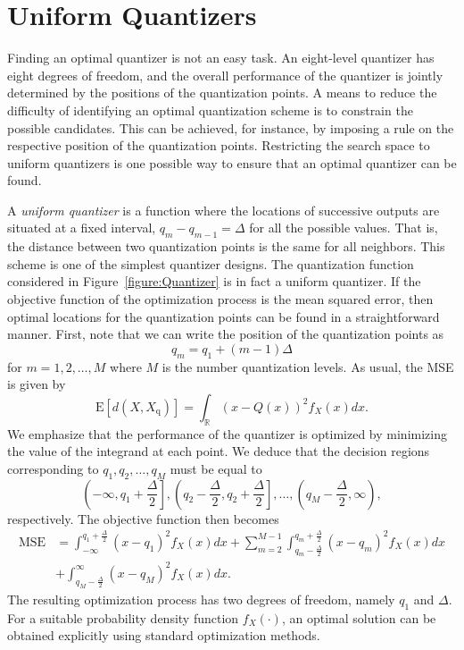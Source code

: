 \section{Uniform Quantizers}
\label{section:UniformQuantizers}

Finding an optimal quantizer is not an easy task.
An eight-level quantizer has eight degrees of freedom, and the overall performance of the quantizer is jointly determined by the positions of the quantization points.
A means to reduce the difficulty of identifying an optimal quantization scheme is to constrain the possible candidates.
This can be achieved, for instance, by imposing a rule on the respective position of the quantization points.
Restricting the search space to uniform quantizers is one possible way to ensure that an optimal quantizer can be found.

A \emph{uniform quantizer} is a function where the locations of successive outputs are situated at a fixed interval, $q_m - q_{m-1} = \Delta$ for all the possible values.
That is, the distance between two quantization points is the same for all neighbors.
This scheme is one of the simplest quantizer designs.
The quantization function considered in Figure~\ref{figure:Quantizer} is in fact a uniform quantizer.
If the objective function of the optimization process is the mean squared error, then optimal locations for the quantization points can be found in a straightforward manner.
First, note that we can write the position of the quantization points as
\begin{equation*}
q_m = q_1 + (m-1) \Delta
\end{equation*}
for $m = 1, 2, \ldots, M$ where $M$ is the number quantization levels.
As usual, the MSE is given by
\begin{equation*}
\mathrm{E} [ d(X, X_{\mathrm{q}}) ]
= \int_{\mathbb{R}} (x - Q(x))^2 f_X(x) dx .
\end{equation*}
We emphasize  that the performance of the quantizer is optimized by minimizing the value of the integrand at each point.
We deduce that the decision regions corresponding to $q_1, q_2, \ldots, q_M$ must be equal to
\begin{equation*}
\left( - \infty, q_1 + \frac{\Delta}{2} \right],
\left( q_2 - \frac{\Delta}{2}, q_2 + \frac{\Delta}{2} \right],
\ldots,
\left( q_M - \frac{\Delta}{2}, \infty \right) ,
\end{equation*}
respectively.
The objective function then becomes
\begin{equation} \label{equation:UniformQuantizerMSE}
\begin{split}
\text{MSE} &= \int_{-\infty}^{q_1 + \frac{\Delta}{2}} (x - q_1)^2 f_X(x) dx
+ \sum_{m=2}^{M-1}
\int_{q_m - \frac{\Delta}{2}}^{q_m + \frac{\Delta}{2}}
(x - q_m)^2 f_X(x) dx \\
&+ \int_{q_M - \frac{\Delta}{2}}^{\infty} (x - q_M)^2 f_X(x) dx .
\end{split}
\end{equation}
The resulting optimization process has two degrees of freedom, namely $q_1$ and $\Delta$.
For a suitable probability density function $f_X(\cdot)$, an optimal solution can be obtained explicitly using standard optimization methods.

